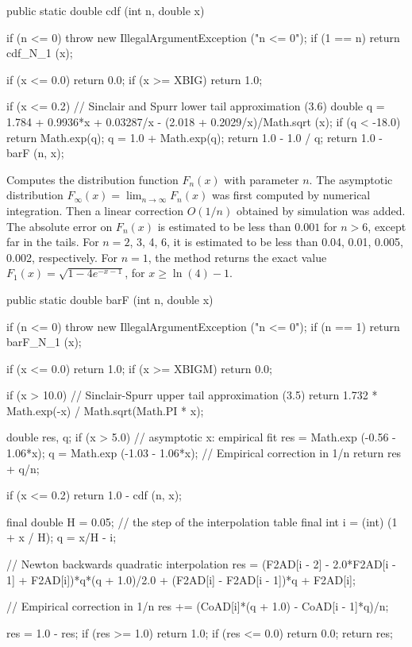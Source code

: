 \begin{code}
   public static double cdf (int n, double x)\begin{hide} {
      if (n <= 0)
         throw new IllegalArgumentException ("n <= 0");
      if (1 == n)
         return cdf_N_1 (x);

      if (x <= 0.0)
         return 0.0;
      if (x >= XBIG)
         return 1.0;

      if (x <= 0.2) {
         // Sinclair and Spurr lower tail approximation (3.6)
         double q = 1.784 + 0.9936*x + 0.03287/x - (2.018 + 0.2029/x)/Math.sqrt (x);
         if (q < -18.0)
            return Math.exp(q);
         q = 1.0 + Math.exp(q);
         return 1.0 - 1.0 / q;
      }
      return 1.0 - barF (n, x);
   }\end{hide}
\end{code}
\begin{tabb}
  Computes the \ad{} distribution function $F_n(x)$ with parameter $n$.
 The asymptotic distribution  $F_\infty(x) = \lim_{n\to\infty} F_n(x)$
  was first computed by numerical integration. 
  Then a linear correction $O(1/n)$ obtained by simulation was added.
  The absolute error on $F_n(x)$ is estimated to be
  less than $0.001$ for $n > 6$, except far in the tails.
  For $n = 2$, 3, 4, 6, it is estimated to be
  less than  0.04, 0.01, 0.005, 0.002, respectively.
  For $n=1$, the method returns the exact value
  $F_1(x) = \sqrt{1 - 4e^{-x-1}}$, for $x\ge \ln(4) - 1$.
 \end{tabb}
\begin{code}

   public static double barF (int n, double x)\begin{hide} {
      if (n <= 0)
         throw new IllegalArgumentException ("n <= 0");
      if (n == 1)
         return barF_N_1 (x);

      if (x <= 0.0)
         return 1.0;
      if (x >= XBIGM)
         return 0.0;

      if (x > 10.0)
      // Sinclair-Spurr upper tail approximation (3.5)
         return 1.732 * Math.exp(-x) / Math.sqrt(Math.PI * x);

      double res, q;
      if (x > 5.0) {
         // asymptotic x:  empirical fit
         res = Math.exp (-0.56 - 1.06*x);
         q = Math.exp (-1.03 - 1.06*x);        // Empirical correction in 1/n
         return res + q/n;
      }

      if (x <= 0.2)
         return 1.0 - cdf (n, x);

      final double H = 0.05;  // the step of the interpolation table
      final int i = (int) (1 +  x / H);
      q = x/H - i;

      // Newton backwards quadratic interpolation
      res = (F2AD[i - 2] - 2.0*F2AD[i - 1] + F2AD[i])*q*(q + 1.0)/2.0
         + (F2AD[i] - F2AD[i - 1])*q + F2AD[i];

      // Empirical correction in 1/n
      res += (CoAD[i]*(q + 1.0) - CoAD[i - 1]*q)/n;

   res = 1.0 - res;
   if (res >= 1.0)
      return 1.0;
   if (res <= 0.0)
      return 0.0;
   return res;
   }\end{hide}
\end{code}
